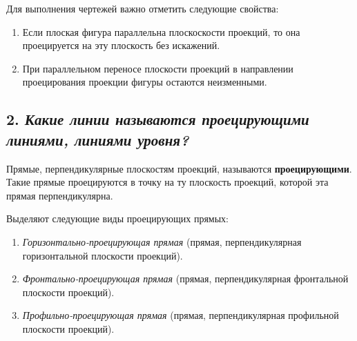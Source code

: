 Для выполнения чертежей важно отметить следующие свойства:

\begin{enumerate}
    \item Если плоская фигура параллельна плоскоскости проекций, то она проецируется на эту плоскость без искажений.
    
    
    \item При параллельном переносе плоскости проекций в направлении проецирования проекции фигуры остаются неизменными.
    
\end{enumerate}


\newpage
\subsection*{2. \textit{Какие линии называются проецирующими линиями, линиями уровня?}}

\begin{mainQuote}
    
\end{mainQuote}

Прямые, перпендикулярные плоскостям проекций, называются {\bf проецирующими}. Такие прямые проецируются в точку на ту плоскость проекций, которой эта
прямая перпендикулярна.

Выделяют следующие виды проецирующих прямых:
\begin{enumerate}
    \item \textit {Горизонтально-проецирующая прямая} (прямая, перпендикулярная горизонтальной плоскости проекций).
    

    \item \textit{Фронтально-проецирующая прямая} (прямая, перпендикулярная фронтальной плоскости проекций).


    \item \textit {Профильно-проецирующая прямая} (прямая, перпендикулярная профильной плоскости проекций).


\end{enumerate}


